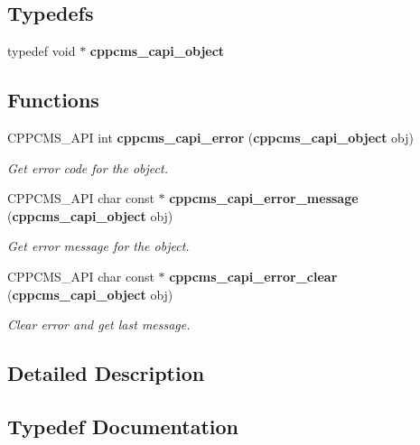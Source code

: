 \subsection*{Typedefs}
\begin{DoxyCompactItemize}
\item 
typedef void $\ast$ {\bf cppcms\+\_\+capi\+\_\+object}
\end{DoxyCompactItemize}
\subsection*{Functions}
\begin{DoxyCompactItemize}
\item 
C\+P\+P\+C\+M\+S\+\_\+\+A\+PI int {\bf cppcms\+\_\+capi\+\_\+error} ({\bf cppcms\+\_\+capi\+\_\+object} obj)\label{group__capi__session__error__handling_gaa3dadd96f7278f2adebf38a234dd9f59}

\begin{DoxyCompactList}\small\item\em Get error code for the object. \end{DoxyCompactList}\item 
C\+P\+P\+C\+M\+S\+\_\+\+A\+PI char const $\ast$ {\bf cppcms\+\_\+capi\+\_\+error\+\_\+message} ({\bf cppcms\+\_\+capi\+\_\+object} obj)\label{group__capi__session__error__handling_ga1d0ecf59aeed3ccae3a7998ea71d8d03}

\begin{DoxyCompactList}\small\item\em Get error message for the object. \end{DoxyCompactList}\item 
C\+P\+P\+C\+M\+S\+\_\+\+A\+PI char const $\ast$ {\bf cppcms\+\_\+capi\+\_\+error\+\_\+clear} ({\bf cppcms\+\_\+capi\+\_\+object} obj)\label{group__capi__session__error__handling_ga0f75da713caf651249da3f0c4ecb90d9}

\begin{DoxyCompactList}\small\item\em Clear error and get last message. \end{DoxyCompactList}\end{DoxyCompactItemize}


\subsection{Detailed Description}


\subsection{Typedef Documentation}
